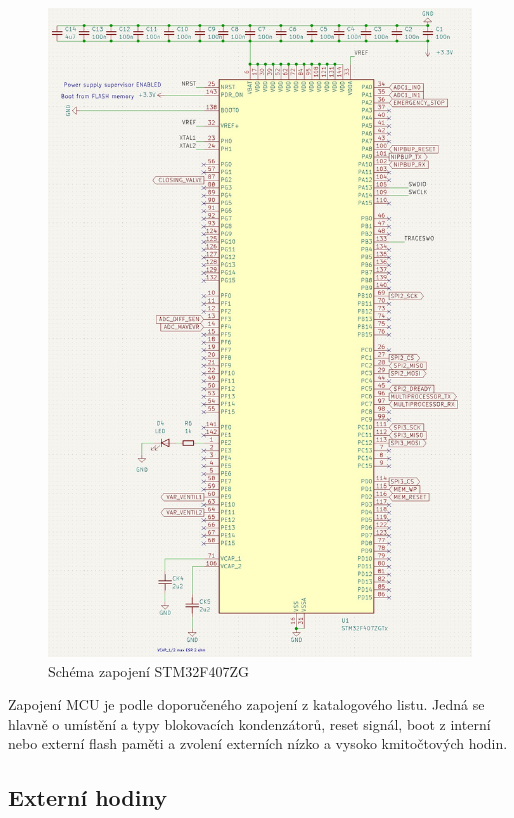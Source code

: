 \begin{figure}[H]
    \centering
    \includegraphics[width=1\linewidth]{pictures/stm_connection.jpg}
    \caption{Schéma zapojení STM32F407ZG}
    \label{fig:stm32_conection}
\end{figure}

Zapojení MCU je podle doporučeného zapojení z katalogového listu. Jedná se hlavně o umístění a typy blokovacích kondenzátorů, reset signál, boot z interní nebo externí flash paměti a zvolení externích nízko a vysoko kmitočtových hodin. \par

\subsection{Externí hodiny}


